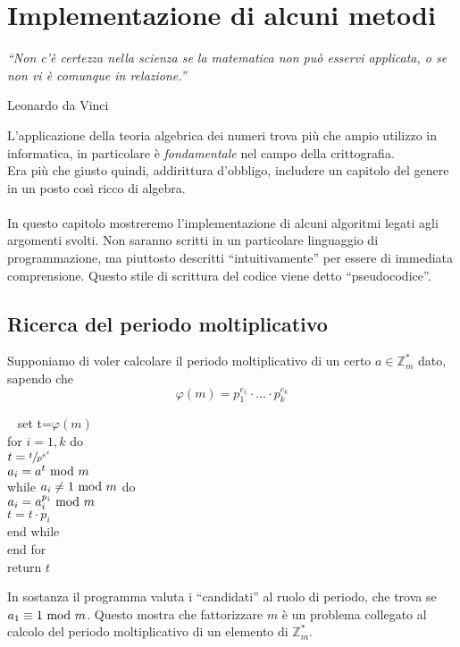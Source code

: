	



\chapter{Implementazione di alcuni metodi}

	\epigraph{\textit{\enquote{Non c'è certezza nella scienza se la matematica non può esservi applicata, o se non vi è comunque in relazione.}}}{Leonardo da Vinci}
	L'applicazione della teoria algebrica dei numeri trova più che ampio utilizzo in informatica, in particolare è \textit{fondamentale} nel campo della crittografia. \\ Era più che giusto quindi, addirittura d'obbligo, includere un capitolo del genere in un posto così ricco di algebra. \\ \\ In questo capitolo mostreremo l'implementazione di alcuni algoritmi legati agli argomenti svolti. Non saranno scritti in un particolare linguaggio di programmazione, ma piuttosto descritti \enquote{intuitivamente} per essere di immediata comprensione. Questo stile di scrittura del codice viene detto \enquote{pseudocodice}. \newpage
	
	
	\section{Ricerca del periodo moltiplicativo}
	Supponiamo di voler calcolare il periodo moltiplicativo di un certo $a\in\mathbb{Z}_m^*$ dato, sapendo che 
	\begin{equation*}
	\varphi(m)=p_1^{e_1}\cdot\dots\cdot p_k^{e_k}
	\end{equation*}
	\begin{algoritmo} \ \newline
			{\selectfont
			\hspace*{10 mm} set t=$\varphi(m)$\\ 
			\hspace*{10 mm} for $i=1,k$ do \\
			\hspace*{15 mm} $t=\sfrac{t}{p^{e^i}}$\\
			\hspace*{15 mm} $a_i=a^t\ \mathrm{mod}\ m$\\
			\hspace*{15 mm} while $a_i\neq1 \ \mathrm{mod}\ m$ do\\
			\hspace*{20 mm} $a_i=a_i^{p_i}\ \mathrm{mod}\ m$\\
			\hspace*{20 mm} $t=t\cdot p_i$\\
			\hspace*{15 mm} end while\\
			\hspace*{10 mm} end for\\
			\hspace*{10 mm} return $t$}
	\end{algoritmo}
	In sostanza il programma valuta i \enquote{candidati} al ruolo di periodo, che trova se $a_1\equiv1\ \mathrm{mod}\ m$. Questo mostra che fattorizzare $m$ è un problema collegato al calcolo del periodo moltiplicativo di un elemento di $\mathbb{Z}_m^*$. 
	

